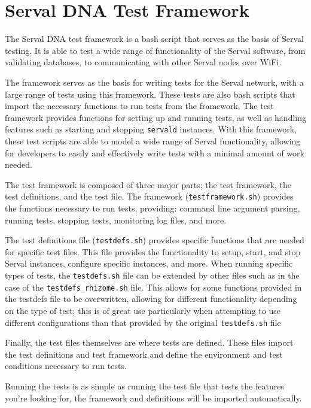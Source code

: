 \section{Serval DNA Test Framework}
The Serval DNA test framework is a bash script that serves as the basis of Serval testing.
It is able to test a wide range of functionality of the Serval software, from validating databases, to communicating with other Serval nodes over WiFi.

The framework serves as the basis for writing tests for the Serval network, with a large range of tests using this framework.
These tests are also bash scripts that import the necessary functions to run tests from the framework. 
The test framework provides functions for setting up and running tests, as well as handling features such as starting and stopping \texttt{servald} instances.
With this framework, these test scripts are able to model a wide range of Serval functionality, allowing for developers to easily and effectively write tests with a minimal amount of work needed.

The test framework is composed of three major parts; the test framework, the test definitions, and the test file.
The framework (\texttt{testframework.sh}) provides the functions necessary to run tests, providing: command line argument parsing, running tests, stopping tests, monitoring log files, and more. 

The test definitions file (\texttt{testdefs.sh}) provides specific functions that are needed for specific test files.
This file provides the functionality to setup, start, and stop Serval instances, configure specific instances, and more.
When running specific types of tests, the \texttt{testdefs.sh} file can be extended by other files such as in the case of the \texttt{testdefs\_rhizome.sh} file. 
This allows for some functions provided in the testdefs file to be overwritten, allowing for different functionality depending on the type of test; this is of great use particularly when attempting to use different configurations than that provided by the original \texttt{testdefs.sh} file

Finally, the test files themselves are where tests are defined. 
These files import the test definitions and test framework and define the environment and test conditions necessary to run tests. 

Running the tests is as simple as running the test file that tests the features you're looking for, the framework and definitions will be imported automatically.

